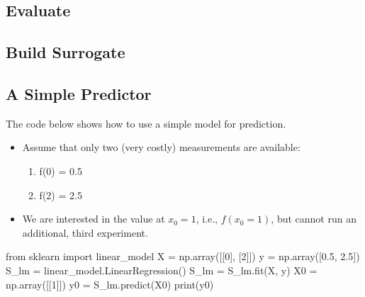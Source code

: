 \documentclass[
  letterpaper,
  DIV=11,
  numbers=noendperiod]{scrreprt}
\newenvironment{Shaded}{\begin{snugshade}}{\end{snugshade}}
\newcommand{\BuiltInTok}[1]{\textcolor[rgb]{0.00,0.23,0.31}{#1}}
\newcommand{\DecValTok}[1]{\textcolor[rgb]{0.68,0.00,0.00}{#1}}
\newcommand{\FloatTok}[1]{\textcolor[rgb]{0.68,0.00,0.00}{#1}}
\newcommand{\ImportTok}[1]{\textcolor[rgb]{0.00,0.46,0.62}{#1}}
\newcommand{\NormalTok}[1]{\textcolor[rgb]{0.00,0.23,0.31}{#1}}
\newcommand{\OperatorTok}[1]{\textcolor[rgb]{0.37,0.37,0.37}{#1}}
\providecommand{\tightlist}{%
  \setlength{\itemsep}{0pt}\setlength{\parskip}{0pt}}\usepackage{longtable,booktabs,array}
\begin{document}
\hypertarget{evaluate}{%
\subsection{Evaluate}\label{evaluate}}

\hypertarget{build-surrogate}{%
\subsection{Build Surrogate}\label{build-surrogate}}

\hypertarget{a-simple-predictor}{%
\subsection{A Simple Predictor}\label{a-simple-predictor}}

The code below shows how to use a simple model for prediction.

\begin{itemize}
\item
  Assume that only two (very costly) measurements are available:

  \begin{enumerate}
  \def\labelenumi{\arabic{enumi}.}
  \tightlist
  \item
    f(0) = 0.5
  \item
    f(2) = 2.5
  \end{enumerate}
\item
  We are interested in the value at \(x_0 = 1\), i.e., \(f(x_0 = 1)\),
  but cannot run an additional, third experiment.
\end{itemize}

\begin{Shaded}
\begin{Highlighting}[]
\ImportTok{from}\NormalTok{ sklearn }\ImportTok{import}\NormalTok{ linear\_model}
\NormalTok{X }\OperatorTok{=}\NormalTok{ np.array([[}\DecValTok{0}\NormalTok{], [}\DecValTok{2}\NormalTok{]])}
\NormalTok{y }\OperatorTok{=}\NormalTok{ np.array([}\FloatTok{0.5}\NormalTok{, }\FloatTok{2.5}\NormalTok{])}
\NormalTok{S\_lm }\OperatorTok{=}\NormalTok{ linear\_model.LinearRegression()}
\NormalTok{S\_lm }\OperatorTok{=}\NormalTok{ S\_lm.fit(X, y)}
\NormalTok{X0 }\OperatorTok{=}\NormalTok{ np.array([[}\DecValTok{1}\NormalTok{]])}
\NormalTok{y0 }\OperatorTok{=}\NormalTok{ S\_lm.predict(X0)}
\BuiltInTok{print}\NormalTok{(y0)}
\end{Highlighting}
\end{Shaded}
\end{document}
